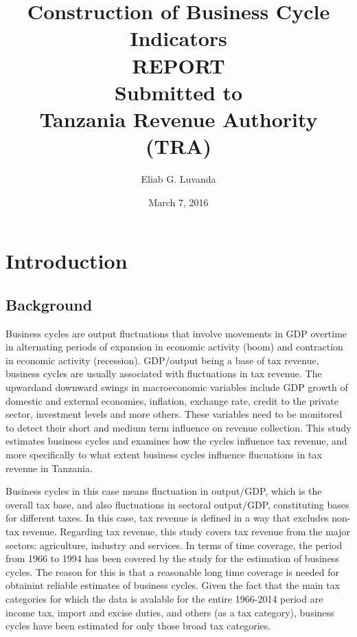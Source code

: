 \documentclass[12pt,a4paper,final]{article}
\author{Eliab G. Luvanda}
\title{Construction of Business Cycle Indicators \\
\textbf{REPORT} \\
Submitted to \\
\textbf{Tanzania Revenue Authority (TRA)}}
\date{March 7, 2016}
\begin{document}
\maketitle

\newpage
{}
\tableofcontents

\listoffigures

\listoftables

\newpage
{}
\section{Introduction}

\subsection{Background}
Business cycles are output fluctuations that involve movements in GDP overtime in alternating periods of expansion in economic activity (boom) and contraction in economic activity (recession). GDP/output being a base of tax revenue, business cycles are usually associated with fluctuations in tax revenue.  The upwardand downward swings in macroeconomic variables include GDP growth of domestic  and external economies, inflation, exchange rate, credit to the private sector, investment levels and more others.  These variables need to be monitored to detect their short and medium term influence on revenue collection. This study estimates business cycles and  examines how the cycles influence tax revenue, and more specifically to what extent business cycles influence flucuations in tax revenue in Tanzania.  

Business cycles in this case means fluctuation in output/GDP, which is the overall tax base, and also fluctuations in sectoral output/GDP, constituting bases for different taxes. In this case, tax revenue is defined in a way that excludes non-tax revenue.  Regarding tax revenue, this study covers tax revenue from the major sectors: agriculture, industry and services. In terms of time coverage, the period from 1966 to 1994 has been covered by the study for the estimation of business cycles. The reason for this is that a reasonable long time coverage is needed for obtainint reliable estimates of business cycles.  Given the fact that the main  tax categories for which the data is avalable for the entire 1966-2014 period are income tax, import and excise duties, and others (as a tax category), business cycles have been estimated for only those broad tax categories. 
\end{document}
